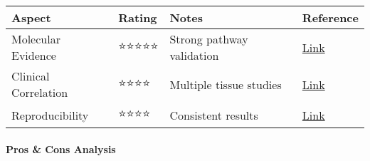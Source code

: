 \begin{longtable}[]{@{}
  >{\raggedright\arraybackslash}p{}
  >{\raggedright\arraybackslash}p{}
  >{\raggedright\arraybackslash}p{}
  >{\raggedright\arraybackslash}p{}@{}}
\toprule\noalign{}
\begin{minipage}[b]{\linewidth}\raggedright
Aspect
\end{minipage} & \begin{minipage}[b]{\linewidth}\raggedright
Rating
\end{minipage} & \begin{minipage}[b]{\linewidth}\raggedright
Notes
\end{minipage} & \begin{minipage}[b]{\linewidth}\raggedright
Reference
\end{minipage} \\
\midrule\noalign{}
\endhead
\bottomrule\noalign{}
\endlastfoot
Molecular Evidence & ⭐⭐⭐⭐⭐ & Strong pathway validation &
\href{https://doi.org/10.1038/s41580-019-0149-8}{Link} \\
Clinical Correlation & ⭐⭐⭐⭐ & Multiple tissue studies &
\href{https://doi.org/10.1016/j.matbio.2018.03.001}{Link} \\
Reproducibility & ⭐⭐⭐⭐ & Consistent results &
\href{https://doi.org/10.1007/s10522-016-9641-0}{Link} \\
\end{longtable}

\paragraph{Pros \& Cons Analysis}\label{pros-cons-analysis}

